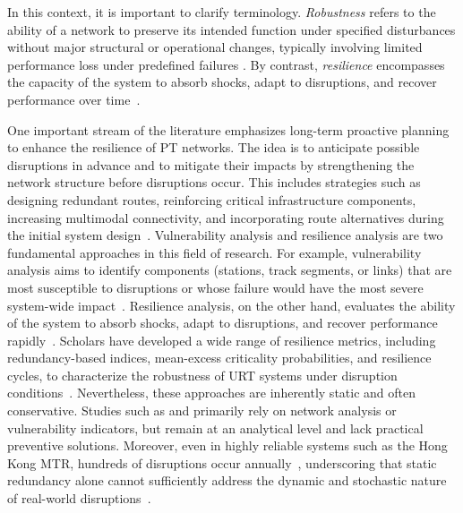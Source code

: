 \documentclass[3p,times,procedia]{elsarticle}
\begin{document}
In this context, it is important to clarify terminology. \emph{Robustness} refers to the ability of a network to preserve its intended function under specified disturbances without major structural or operational changes, typically involving limited performance loss under predefined failures \citep{Cats2016,Ge2022,JRC2015}.
By contrast, \emph{resilience} encompasses the capacity of the system to absorb shocks, adapt to disruptions, and recover performance over time~\citep{NRC2012,TierneyBruneau2007,Bruneau2003}.

One important stream of the literature emphasizes long-term proactive planning to enhance the resilience of PT networks. 
The idea is to anticipate possible disruptions in advance and to mitigate their impacts by strengthening the network structure 
before disruptions occur. 
This includes strategies such as designing redundant routes, reinforcing critical infrastructure components, 
increasing multimodal connectivity, and incorporating route alternatives during the initial system design~\citep{Codina2014,LiWang2019,CatsJenelius2014,Jin2014}. 
Vulnerability analysis and resilience analysis are two fundamental approaches in this field of research. 
For example, vulnerability analysis aims to identify components (stations, track segments, or links) that are most susceptible to disruptions 
or whose failure would have the most severe system-wide impact~\citep{DeLosSantos2012,RodriguezNunez2014}. 
Resilience analysis, on the other hand, evaluates the ability of the system to absorb shocks, adapt to disruptions, and recover performance 
rapidly~\citep{XuChopra2022,ChenMillerHooks2012}. 
Scholars have developed a wide range of resilience metrics, including redundancy-based indices, 
mean-excess criticality probabilities, and resilience cycles, to characterize the robustness of URT systems under disruption conditions~\citep{Zhang2015topology, XuChopra2022}.
Nevertheless, these approaches are inherently static and often conservative. 
Studies such as \citet{LiWang2019} and \citet{CatsJenelius2014} primarily rely on network analysis or vulnerability indicators, 
but remain at an analytical level and lack practical preventive solutions. 
Moreover, even in highly reliable systems such as the Hong Kong MTR, hundreds of disruptions occur annually~\citep{zhang2020metro}, underscoring that static redundancy alone cannot sufficiently address the dynamic and stochastic nature of real-world disruptions~\citep{Besinovic2020,Lusby2018}.
\end{document}
